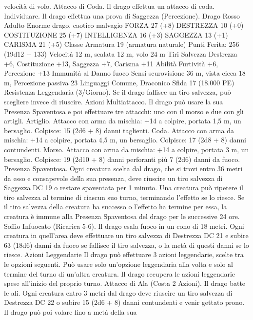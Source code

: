 \begin{multicols}{2}
velocità di volo.
Attacco di Coda. Il drago effettua un attacco di coda.
Individuare. Il drago effettua una prova di Saggezza
(Percezione).
Drago Rosso Adulto
Enorme drago, caotico malvagio
FORZA 27 (+8)
DESTREZZA 10 (+0)
COSTITUZIONE 25 (+7)
INTELLIGENZA 16 (+3)
SAGGEZZA 13 (+1)
CARISMA 21 (+5)
Classe Armatura 19 (armatura naturale)
\hspace*{0pt}\hfill{Punti Ferita}: 256 (19d12 + 133)
Velocità 12 m, scalata 12 m, volo 24 m
Tiri Salvezza Destrezza +6, Costituzione +13, Saggezza +7,
Carisma +11
Abilità Furtività +6, Percezione +13
Immunità al Danno fuoco
Sensi scurovisione 36 m, vista cieca 18 m, Percezione passiva 23
Linguaggi Comune, Draconico
Sfida 17 (18.000 PE)
Resistenza Leggendaria (3/Giorno). Se il drago fallisce un tiro
salvezza, può scegliere invece di riuscire.
Azioni
Multiattacco. Il drago può usare la sua Presenza Spaventosa e
poi effettuare tre attacchi: uno con il morso e due con gli artigli.
Artiglio. Attacco con arma da mischia: +14 a colpire, portata 1,5
m, un bersaglio.
Colpisce: 15 (2d6 + 8) danni taglienti.
Coda. Attacco con arma da mischia: +14 a colpire, portata 4,5
m, un bersaglio.
Colpisce: 17 (2d8 + 8) danni contundenti.
Morso. Attacco con arma da mischia: +14 a colpire, portata 3 m,
un bersaglio.
Colpisce: 19 (2d10 + 8) danni perforanti più 7 (2d6) danni da
fuoco.
Presenza Spaventosa. Ogni creatura scelta dal drago, che si trovi
entro 36 metri da esso e consapevole della sua presenza, deve
riuscire un tiro salvezza di Saggezza DC 19 o restare spaventata
per 1 minuto. Una creatura può ripetere il tiro salvezza al termine
di ciascun suo turno, terminando l’effetto se lo riesce. Se il tiro
salvezza della creatura ha successo o l’effetto ha termine per
essa, la creatura è immune alla Presenza Spaventosa del drago
per le successive 24 ore.
Soffio Infuocato (Ricarica 5-6). Il drago esala fuoco in un cono
di 18 metri. Ogni creatura in quell’area deve effettuare un tiro
salvezza di Destrezza DC 21 e subire 63 (18d6) danni da fuoco
se fallisce il tiro salvezza, o la metà di questi danni se lo riesce.
Azioni Leggendarie
Il drago può effettuare 3 azioni leggendarie, scelte tra le opzioni
seguenti. Può usare solo un’opzione leggendaria alla volta e solo
al termine del turno di un’altra creatura. Il drago recupera le
azioni leggendarie spese all’inizio del proprio turno.
Attacco di Ala (Costa 2 Azioni). Il drago batte le ali. Ogni
creatura entro 3 metri dal drago deve riuscire un tiro salvezza di
Destrezza DC 22 o subire 15 (2d6 + 8) danni contundenti e venir
gettato prono. Il drago può poi volare fino a metà della sua

\end{multicols}
